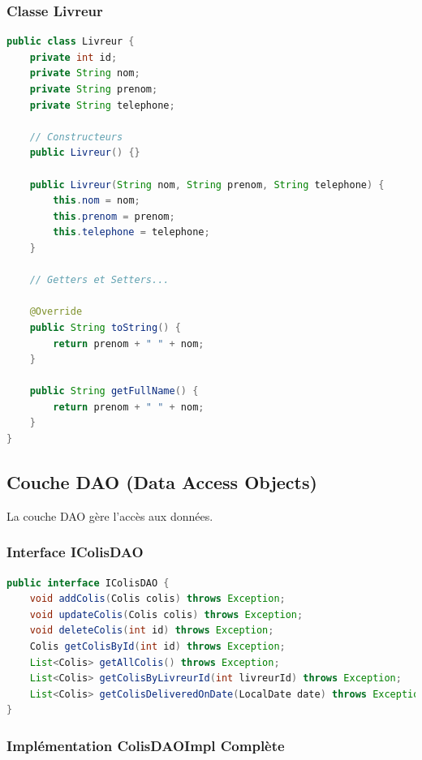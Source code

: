 \documentclass{rapportENSIAS}
\begin{document}
\subsubsection{Classe Livreur}

\begin{lstlisting}[language=Java, caption=Entit\'{e} Livreur]
public class Livreur {
    private int id;
    private String nom;
    private String prenom;
    private String telephone;
    
    // Constructeurs
    public Livreur() {}
    
    public Livreur(String nom, String prenom, String telephone) {
        this.nom = nom;
        this.prenom = prenom;
        this.telephone = telephone;
    }
    
    // Getters et Setters...
    
    @Override
    public String toString() {
        return prenom + " " + nom;
    }
    
    public String getFullName() {
        return prenom + " " + nom;
    }
}
\end{lstlisting}

\subsection{Couche DAO (Data Access Objects)}

La couche DAO g\`{e}re l'acc\`{e}s aux donn\'{e}es.

\subsubsection{Interface IColisDAO}

\begin{lstlisting}[language=Java, caption=Interface IColisDAO]
public interface IColisDAO {
    void addColis(Colis colis) throws Exception;
    void updateColis(Colis colis) throws Exception;
    void deleteColis(int id) throws Exception;
    Colis getColisById(int id) throws Exception;
    List<Colis> getAllColis() throws Exception;
    List<Colis> getColisByLivreurId(int livreurId) throws Exception;
    List<Colis> getColisDeliveredOnDate(LocalDate date) throws Exception;
}
\end{lstlisting}

\subsubsection{Impl\'{e}mentation ColisDAOImpl Compl\`{e}te}
\end{document}
